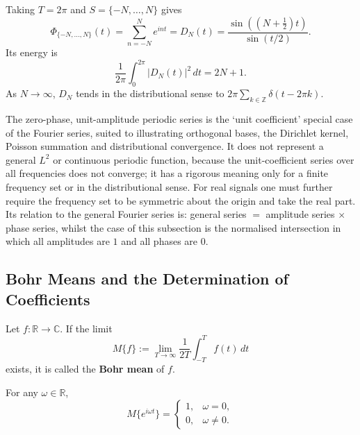 \begin{example}\label{ex:dirichlet_kernel_truncation}
Taking $T=2\pi$ and $S=\{-N,\dots,N\}$ gives
\[
\Phi_{\{-N,\dots,N\}}(t)
=\sum_{n=-N}^{N}e^{int}
=D_N(t)
=\frac{\sin((N+\tfrac12)t)}{\sin(t/2)}.
\]
Its energy is
\[
\frac{1}{2\pi}\int_0^{2\pi}|D_N(t)|^2\,dt=2N+1.
\]
As $N\to\infty$, $D_N$ tends in the distributional sense to $2\pi\sum_{k\in\mathbb{Z}}\delta(t-2\pi k)$.
\end{example}

\begin{remark}\label{rem:unit_phase_zero_scope}
The zero-phase, unit-amplitude periodic series is the `unit coefficient' special case of the Fourier series, suited to illustrating orthogonal bases, the Dirichlet kernel, Poisson summation and distributional convergence. It does not represent a general $L^2$ or continuous periodic function, because the unit-coefficient series over all frequencies does not converge; it has a rigorous meaning only for a finite frequency set or in the distributional sense. For real signals one must further require the frequency set to be symmetric about the origin and take the real part. Its relation to the general Fourier series is: general series $=$ amplitude series $\times$ phase series, whilst the case of this subsection is the normalised intersection in which all amplitudes are $1$ and all phases are $0$.
\end{remark}

\subsection{\texorpdfstring{Bohr Means and the Determination of Coefficients}{Bohr Means and the Determination of Coefficients}}

\begin{definition}\label{def:bohr_mean}
Let $f: \mathbb{R} \to \mathbb{C}$. If the limit
\[
M\{f\} := \lim_{T \to \infty} \frac{1}{2T} \int_{-T}^{T} f(t)\,dt
\]
exists, it is called the \textbf{Bohr mean} of $f$.
\end{definition}

\begin{lemma}\label{lem:bohr_mean_exponential}
For any $\omega \in \mathbb{R}$,
\[
M\{e^{i\omega t}\} =
\begin{cases}
1, & \omega = 0, \\
0, & \omega \neq 0.
\end{cases}
\]
\end{lemma}

